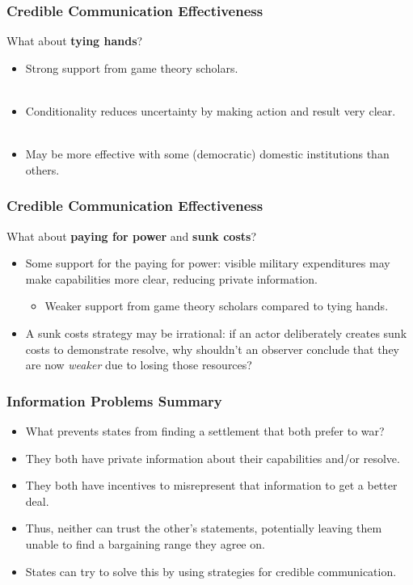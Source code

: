 \documentclass[handout]{beamer}
\begin{document}
\begin{frame} 
	\frametitle{\LARGE{Credible Communication Effectiveness}}
	What about \textbf{tying hands}? \pause
	\begin{itemize}
		\item Strong support from game theory scholars. \pause
		\\~\\
		\item Conditionality reduces uncertainty by making action and result very clear. \pause
		\\~\\
		\item May be more effective with some (democratic) domestic institutions than others.
	\end{itemize}
\end{frame}

\begin{frame} 
	\frametitle{\LARGE{Credible Communication Effectiveness}}
	What about \textbf{paying for power} and \textbf{sunk costs}? \pause
	\begin{itemize}
		\item Some support for the paying for power: visible military expenditures may make capabilities more clear, reducing private information. \pause
		\begin{itemize}
			\item Weaker support from game theory scholars compared to tying hands. \pause
		\end{itemize}
		\item A sunk costs strategy may be irrational: if an actor deliberately creates sunk costs to demonstrate resolve, why shouldn't an observer conclude that they are now \textit{weaker} due to losing those resources?
	\end{itemize}
\end{frame}

\begin{frame} 
	\frametitle{\LARGE{Information Problems Summary}}
	\begin{itemize}
		\item What prevents states from finding a settlement that both prefer to war?
		\item They both have private information about their capabilities and/or resolve.
		\item They both have incentives to misrepresent that information to get a better deal.
		\item Thus, neither can trust the other's statements, potentially leaving them unable to find a bargaining range they agree on.
		\item States can try to solve this by using strategies for credible communication.
	\end{itemize}
\end{frame}
\end{document}
